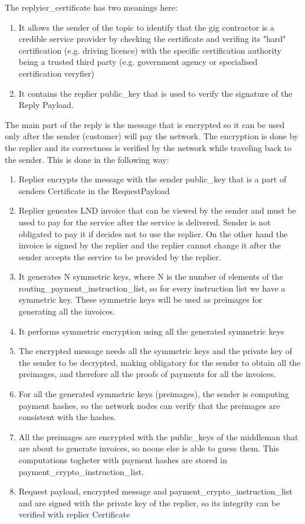\documentclass{article}
\begin{document}
The replyier\_certificate has two meanings here:

\begin{enumerate}
	\item It allows the sender of the topic to identify that the gig contractor is a credible service provider by checking the certificate and verifing its "hard" certification (e.g. driving licence) with the specific certification authority being a trusted third party (e.g. government agency or specialised certification veryfier)
	\item It contains the replier public\_key that is used to verify the signature of the Reply Payload.
\end{enumerate}

The main part of the reply is the message that is encrypted so it can be used only after the sender (customer) will pay the network. The encryption is done by the replier and its correctness is verified by the network while traveling back to the sender. This is done in the following way:

\begin{enumerate}
	\item Replier encrypts the message with the sender public\_key that is a part of senders Certificate in the RequestPayload
	\item Replier geneates LND invoice that can be viewed by the sender and must be used to pay for the service after the service is delivered. Sender is not obligated to pay it if decides not to use the replier. On the other hand the invoice is signed by the replier and the replier cannot change it after the sender accepts the service to be provided by the replier.
	\item It generates N symmetric keys, where N is the number of elements of the routing\_payment\_instruction\_list, so for every instruction list we have a symmetric key. These symmetric keys will be used as preimages for generating all the invoices.
	\item It performs symmetric encryption using all the generated symmetric keys
	\item The encrypted message needs all the symmetric keys and the private key of the sender to be decrypted, making obligatory for the sender to obtain all the preimages, and therefore all the proofs of payments for all the invoices.
	\item For all the generated symmetric keys (preimages), the sender is computing payment hashes, so the network nodes can verify that the preimages are consistent with the hashes.
	\item All the preimages are encrypted with the public\_keys of the middleman that are about to generate invoices, so noone else is able to guess them. This computations togheter with payment hashes are stored in payment\_crypto\_instruction\_list.
	\item Request payload, encrypted message and payment\_crypto\_instruction\_list and are signed with the private key of the replier, so its integrity can be verified with replier Certificate
\end{enumerate}
\end{document}
